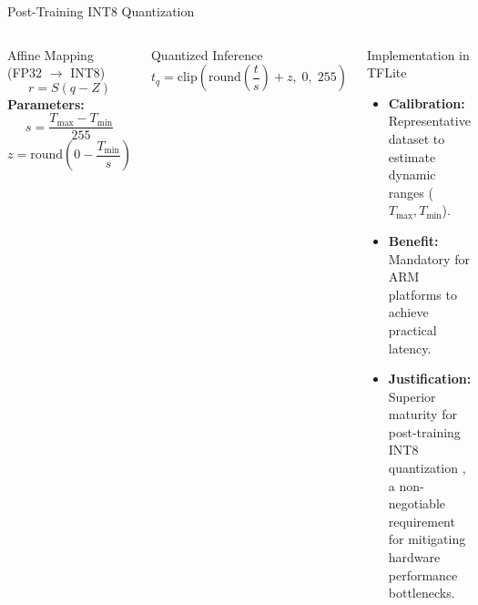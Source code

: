 \documentclass[aspectratio=169]{beamer}
\let\oldcite\cite %
\renewcommand{\cite}[1]{{\tiny\oldcite{#1}}}
\begin{document}
\begin{frame}{Post-Training INT8 Quantization}
    \begin{columns}[T, onlytextwidth]
        \begin{block}{Affine Mapping (FP32 $\to$ INT8)}
            \scriptsize
            \[ r = S(q - Z) \]
            \textbf{Parameters:}
            \[ s = \frac{T_{\max} - T_{\min}}{255} \]
            \[ z = \mathrm{round}\!\left(0 - \frac{T_{\min}}{s}\right) \]
        \end{block}
        \begin{block}{Quantized Inference}
            \tiny
            \[ t_q = \mathrm{clip} \left( \mathrm{round}\!\left(\frac{t}{s}\right) + z,\; 0,\; 255 \right) \]
        \end{block}

        \begin{exampleblock}{Implementation in TFLite}
            \scriptsize
            \begin{itemize}
                \item \textbf{Calibration:} Representative dataset to estimate dynamic ranges ($T_{\max}, T_{\min}$).
                \item \textbf{Benefit:} Mandatory for ARM platforms to achieve practical latency.
                \item \textbf{Justification:} Superior maturity for post-training INT8 quantization \cite{kang2022evaluation}, a non-negotiable requirement for mitigating hardware performance bottlenecks.
            \end{itemize}
        \end{exampleblock}
    \end{columns}
\end{frame}
\end{document}
